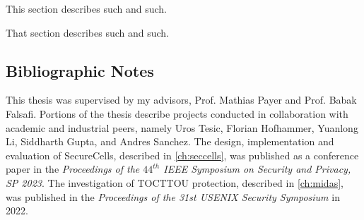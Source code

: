 This section describes such and such.

That section describes such and such.

\subsection{Bibliographic Notes}
This thesis was supervised by my advisors, Prof. Mathias Payer and Prof. Babak Falsafi.
Portions of the thesis describe projects conducted in collaboration with academic and
industrial peers, namely Uros Tesic, Florian Hofhammer, Yuanlong Li, Siddharth Gupta, 
and Andres Sanchez.
The design, implementation and evaluation of SecureCells, described in 
\autoref{ch:seccells}, was published as a conference paper in the 
\emph{Proceedings of the $44^{th}$ IEEE Symposium on Security and Privacy, SP 2023}.
The investigation of TOCTTOU protection, described in \autoref{ch:midas},
was published in the
\emph{Proceedings of the 31st USENIX Security Symposium} in 2022.


